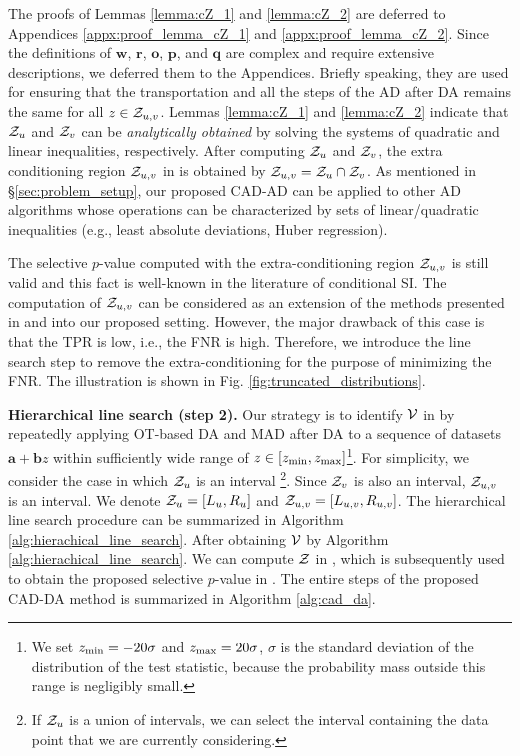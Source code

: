 The proofs of Lemmas \ref{lemma:cZ_1} and \ref{lemma:cZ_2} are deferred to Appendices \ref{appx:proof_lemma_cZ_1} and \ref{appx:proof_lemma_cZ_2}.
%
Since the definitions of $\bm w$, $\bm r$, $\bm o$, $\bm p$, and $\bm q$ are complex and require extensive descriptions, we deferred them to the Appendices.
%
Briefly speaking, they are used for ensuring that the transportation and all the steps of the AD after DA remains the same for all $z \in {\mathcal Z}_{u, v}$.
%
Lemmas \ref{lemma:cZ_1} and \ref{lemma:cZ_2} indicate that ${\mathcal Z}_u$ and ${\mathcal Z}_v$ can be \emph{analytically obtained} by solving the systems of quadratic and linear inequalities, respectively.
%
After computing ${\mathcal Z}_u$ and ${\mathcal Z}_v$, the extra conditioning region ${\mathcal Z}_{u, v}$ in  is obtained by ${\mathcal Z}_{u, v}  = {\mathcal Z}_u \cap {\mathcal Z}_v$.
%
As mentioned in \S \ref{sec:problem_setup}, our proposed CAD-AD can be applied to other AD algorithms whose operations can be characterized by sets of linear/quadratic inequalities (e.g., least absolute deviations, Huber regression).


\begin{remark}
The selective $p$-value computed with the extra-conditioning region ${\mathcal Z}_{u, v}$ is still valid and this fact is well-known in the literature of conditional SI.
%
The computation of ${\mathcal Z}_{u, v}$ can be considered as an extension of the methods presented in \cite{lee2016exact} and \cite{duy2021exact} into our proposed setting.
%
However, the major drawback of this case is that the TPR is low, i.e., the FNR is high.
%
Therefore, we introduce the line search step to remove the extra-conditioning for the purpose of minimizing the FNR.
%
The illustration is shown in Fig. \ref{fig:truncated_distributions}.
 
\end{remark}



\textbf{Hierarchical line search (step 2).}
Our strategy is to identify ${\mathcal V}$ in  by repeatedly applying OT-based DA and MAD after DA  to a sequence of datasets $\bm a + \bm b z$ within sufficiently wide range of $z \in [z_{\rm min}, z_{\rm max}]$\footnote{We set $z_{\rm min} = -20\sigma$ and $z_{\rm max} = 20 \sigma$, $\sigma$ is the standard deviation of the distribution of the test statistic, because the probability mass outside this range is negligibly small.}.
%
For simplicity, we consider the case in which ${\mathcal Z}_u$ is an interval \footnote{If ${\mathcal Z}_u$ is a union of intervals, we can select the interval containing the data point that we are currently considering.}. 
%
Since ${\mathcal Z}_v$ is also an interval, ${\mathcal Z}_{u, v}$ is an interval.
%
We denote ${\mathcal Z}_u = [L_u, R_u]$ and ${\mathcal Z}_{u, v} = [L_{u, v}, R_{u, v}]$.
%
The hierarchical line search procedure can be summarized in Algorithm \ref{alg:hierachical_line_search}.
%
After obtaining ${\mathcal V}$ by Algorithm \ref{alg:hierachical_line_search}.
%
We can compute ${\mathcal Z}$ in , which is subsequently used to obtain the proposed selective $p$-value in .
%
The entire steps of the proposed CAD-DA method is summarized in Algorithm \ref{alg:cad_da}.




